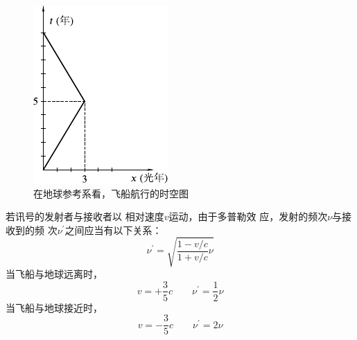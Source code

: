 \begin{figure}
  \centering
  \includegraphics{figure/fig11.02}
  \caption{在地球参考系看，飞船航行的时空图}
  \label{fig:11.02}
\end{figure}
若讯号的发射者与接收者以
相对速度$ v $运动，由于多普勒效
应，发射的频次$ \nu $与接收到的频
次$ \nu ^ \prime $之间应当有以下关系：
{\setlength{\mathindent}{4em}
\begin{equation*}
  \nu ^ { \prime } = \sqrt { \frac { 1 - v / c } { 1 + v / c } \nu }
\end{equation*}}
当飞船与地球远离时，
{\setlength{\mathindent}{4em}
\begin{equation*}
  v = + \frac { 3 } { 5 } c \qquad \nu ^ { \prime } = \frac 1 2 \nu
\end{equation*}}
当飞船与地球接近时，
{\setlength{\mathindent}{4em}
\begin{equation*}
  v = - \frac { 3 } { 5 } c \qquad \nu ^ { \prime } = 2 \nu
\end{equation*}}

